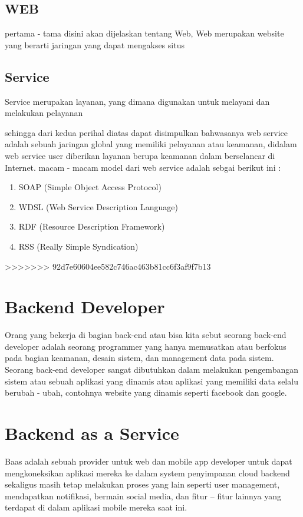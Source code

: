 \subsection{WEB}
pertama - tama disini akan dijelaskan tentang Web, Web merupakan website yang berarti jaringan yang dapat mengakses situs

\subsection{Service}
Service merupakan layanan, yang dimana digunakan untuk melayani dan melakukan pelayanan

sehingga dari kedua perihal diatas dapat disimpulkan bahwasanya web service adalah sebuah jaringan global yang memiliki pelayanan atau keamanan,
didalam web service user diberikan layanan berupa keamanan dalam berselancar di Internet. macam - macam model dari web service adalah sebgai berikut ini :

\begin{enumerate}
\item SOAP (Simple Object Access Protocol)
\item WDSL (Web Service Description Language)
\item RDF (Resource Description Framework)
\item RSS (Really Simple Syndication)
\end {enumerate}
>>>>>>> 92d7e60604ee582c746ac463b81cc6f3af9f7b13

\section{Backend Developer}
Orang yang bekerja di bagian back-end atau bisa kita sebut seorang back-end developer adalah seorang programmer yang hanya
memusatkan atau berfokus pada bagian keamanan, desain sistem, dan management data pada sistem. Seorang back-end developer
sangat dibutuhkan dalam melakukan pengembangan sistem atau sebuah aplikasi yang dinamis atau aplikasi yang memiliki data selalu
berubah - ubah, contohnya website yang dinamis seperti facebook dan google.

\section{Backend as a Service}
Baas adalah sebuah provider untuk web dan mobile app developer untuk dapat mengkoneksikan 
aplikasi mereka ke dalam system penyimpanan cloud backend sekaligus masih tetap melakukan proses yang lain seperti user management, 
mendapatkan notifikasi, bermain social media, dan fitur – fitur lainnya yang terdapat di dalam aplikasi mobile mereka saat ini.

